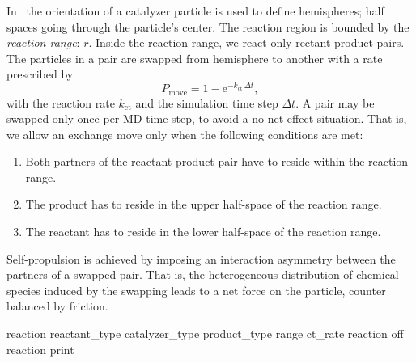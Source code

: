 In \es\ the orientation of a catalyzer particle is used to define hemispheres; half spaces going through the particle's center. The reaction region is bounded by the \textit{reaction range}: $r$. Inside the reaction range, we react only rectant-product pairs. The particles in a pair are swapped from hemisphere to another with a rate prescribed by
\begin{equation}
  \label{eq:prob}
  P_{\text{move}} = 1 - \mathrm{e}^{-k_{\text{ct}}\,\Delta t} ,
\end{equation}
with the reaction rate $k_{\text{ct}}$ and the simulation time step $\Delta t$. A pair may be swapped only once per MD time step, to avoid a no-net-effect situation. That is, we allow an exchange move only when the following conditions are met:
\begin{enumerate}
\item Both partners of the reactant-product pair have to reside within
  the reaction range.
\item The product has to reside in the upper half-space of the
  reaction range.
\item The reactant has to reside in the lower half-space of the
  reaction range.
\end{enumerate}
Self-propulsion is achieved by imposing an interaction asymmetry between the partners of a swapped pair. That is, the heterogeneous distribution of chemical species induced by the swapping leads to a net force on the particle, counter balanced by friction.

\begin{pysyntax}
\end{pysyntax}

\begin{essyntax}
 reaction reactant_type  catalyzer_type  
product_type  range  ct_rate  
 reaction off
 reaction print
\begin{features}
\end{features}
\end{essyntax}

